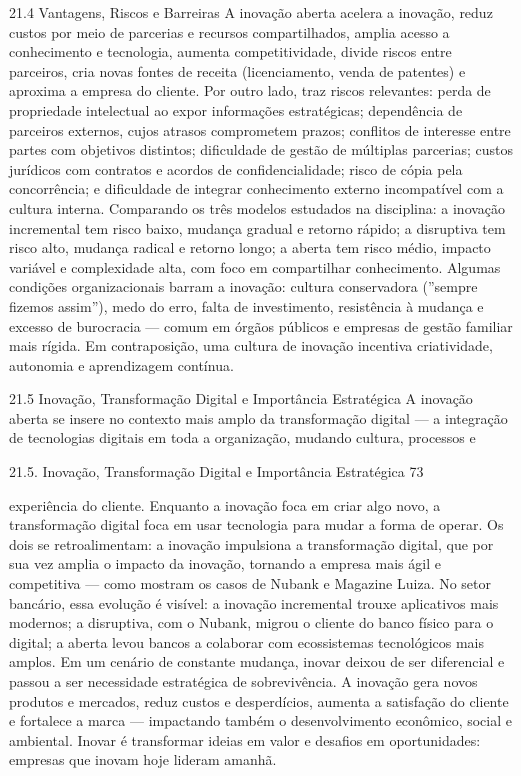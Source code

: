 21.4 Vantagens, Riscos e Barreiras A inovação aberta acelera a inovação, reduz custos por meio de parcerias e recursos compartilhados, amplia acesso a conhecimento e tecnologia, aumenta competitividade, divide riscos entre parceiros, cria novas fontes de receita (licenciamento, venda de patentes) e aproxima a empresa do cliente. Por outro lado, traz riscos relevantes: perda de propriedade intelectual ao expor informações estratégicas; dependência de parceiros externos, cujos atrasos comprometem prazos; conflitos de interesse entre partes com objetivos distintos; dificuldade de gestão de múltiplas parcerias; custos jurídicos com contratos e acordos de confidencialidade; risco de cópia pela concorrência; e dificuldade de integrar conhecimento externo incompatível com a cultura interna. Comparando os três modelos estudados na disciplina: a inovação incremental tem risco baixo, mudança gradual e retorno rápido; a disruptiva tem risco alto, mudança radical e retorno longo; a aberta tem risco médio, impacto variável e complexidade alta, com foco em compartilhar conhecimento. Algumas condições organizacionais barram a inovação: cultura conservadora (”sempre fizemos assim”), medo do erro, falta de investimento, resistência à mudança e excesso de burocracia — comum em órgãos públicos e empresas de gestão familiar mais rígida. Em contraposição, uma cultura de inovação incentiva criatividade, autonomia e aprendizagem contínua.

21.5 Inovação, Transformação Digital e Importância Estratégica A inovação aberta se insere no contexto mais amplo da transformação digital — a integração de tecnologias digitais em toda a organização, mudando cultura, processos e

21.5. Inovação, Transformação Digital e Importância Estratégica 73

experiência do cliente. Enquanto a inovação foca em criar algo novo, a transformação digital foca em usar tecnologia para mudar a forma de operar. Os dois se retroalimentam: a inovação impulsiona a transformação digital, que por sua vez amplia o impacto da inovação, tornando a empresa mais ágil e competitiva — como mostram os casos de Nubank e Magazine Luiza. No setor bancário, essa evolução é visível: a inovação incremental trouxe aplicativos mais modernos; a disruptiva, com o Nubank, migrou o cliente do banco físico para o digital; a aberta levou bancos a colaborar com ecossistemas tecnológicos mais amplos. Em um cenário de constante mudança, inovar deixou de ser diferencial e passou a ser necessidade estratégica de sobrevivência. A inovação gera novos produtos e mercados, reduz custos e desperdícios, aumenta a satisfação do cliente e fortalece a marca — impactando também o desenvolvimento econômico, social e ambiental. Inovar é transformar ideias em valor e desafios em oportunidades: empresas que inovam hoje lideram amanhã.

